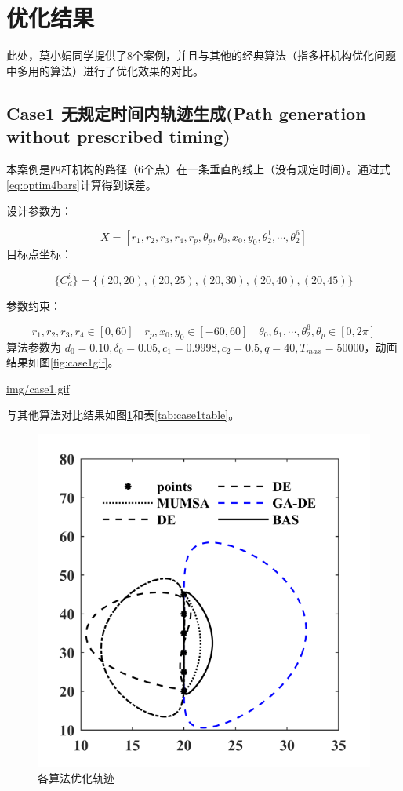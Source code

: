 \documentclass[]{ctexbook}
\begin{document}
\section{优化结果}

此处，莫小娟同学提供了8个案例，并且与其他的经典算法（指多杆机构优化问题中多用的算法）进行了优化效果的对比。

\subsection{Case1 无规定时间内轨迹生成(Path generation without
prescribed
timing)}\label{case1-path-generation-without-prescribed-timing}

本案例是四杆机构的路径（6个点）在一条垂直的线上（没有规定时间）。通过式\eqref{eq:optim4bars}计算得到误差。

设计参数为：

\[
X = [r_1,r_2,r_3,r_4,r_p,\theta_p,\theta_0,x_0,y_0,\theta_2^1,\cdots,\theta_2^6]
\] 目标点坐标：

\[
\{C_d^i\} = \{(20,20),(20,25),(20,30),(20,40),(20,45)\}
\]

参数约束：

\[
r_1,r_2,r_3,r_4\in[0,60]\quad r_p,x_0,y_0\in[-60,60]\quad \theta_0,\theta_1,\cdots,\theta_2^6,\theta_p\in[0,2\pi]
\] 算法参数为
\(d_0 = 0.10,\delta_0=0.05,c_1=0.9998,c_2=0.5,q=40,T_{max}=50000\)，动画结果如图\ref{fig:case1gif}。

\url{img/case1.gif}

与其他算法对比结果如图\ref{fig:case1png}和表\ref{tab:case1table}。

\begin{figure}

{\centering \includegraphics[width=0.5\linewidth]{img/case1png} 

}

\caption{各算法优化轨迹}\label{fig:case1png}
\end{figure}
\end{document}
